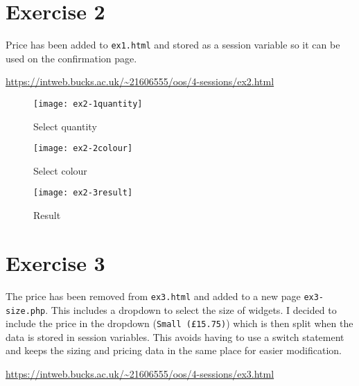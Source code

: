 \clearpage
\section{Exercise 2}

Price has been added to \texttt{ex1.html} and stored as a session variable so it can be used on the confirmation page.

\url{https://intweb.bucks.ac.uk/~21606555/oos/4-sessions/ex2.html}

\captionsetup{type=figure}


\clearpage
\captionsetup{type=figure}


\captionsetup{type=figure}


\begin{figure}[H]
  \caption{Select quantity}
  \centering
  \texttt{[image: ex2-1quantity]}
\end{figure}

\begin{figure}[H]
  \caption{Select colour}
  \centering
  \texttt{[image: ex2-2colour]}
\end{figure}

\begin{figure}[H]
  \caption{Result}
  \centering
  \texttt{[image: ex2-3result]}
\end{figure}

\clearpage
\section{Exercise 3}

The price has been removed from \texttt{ex3.html} and added to a new page \texttt{ex3-size.php}. This includes a dropdown to select the size of widgets. I decided to include the price in the dropdown (\texttt{Small (£15.75)}) which is then split when the data is stored in session variables. This avoids having to use a switch statement and keeps the sizing and pricing data in the same place for easier modification.

\url{https://intweb.bucks.ac.uk/~21606555/oos/4-sessions/ex3.html}

\captionsetup{type=figure}


